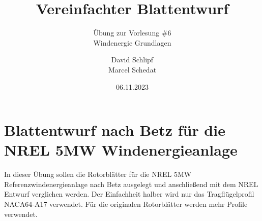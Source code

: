 \documentclass[a4paper,11pt,DIV=20,BCOR=10mm] {scrartcl}
\title{Vereinfachter Blattentwurf}
\subtitle{\ifsolution{\textcolor{red}{Lösung der }}\fi Übung zur Vorlesung \#6 \\ Windenergie Grundlagen}
\author{David Schlipf\\Marcel Schedat}
\date{06.11.2023}
\begin{document}
\maketitle 
\section*{Blattentwurf nach Betz für die NREL 5MW Windenergieanlage}
In dieser Übung sollen die Rotorblätter für die NREL 5MW Referenzwindenergieanlage \cite{Jonkman2009a} nach Betz ausgelegt und anschließend mit dem NREL Entwurf verglichen werden. Der Einfachheit halber wird nur das Tragflügelprofil NACA64-A17 verwendet. Für die originalen Rotorblätter werden mehr Profile verwendet.
\end{document}
